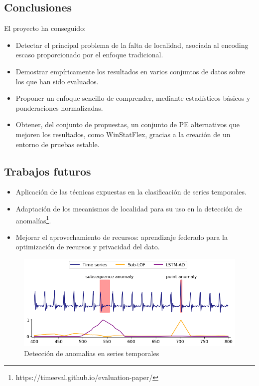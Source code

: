 \documentclass[compress]{beamer}
\begin{document}
\subsection{Conclusiones}
\begin{frame}{}
		El proyecto ha conseguido:
		\begin{itemize}
			\item Detectar el principal problema de la falta de localidad, asociada al encoding escaso proporcionado por el enfoque tradicional.
			\item Demostrar empíricamente los resultados en varios conjuntos de datos sobre los que han sido evaluados.
			\item Proponer un enfoque sencillo de comprender,  mediante estadísticos básicos y ponderaciones normalizadas.
			\item Obtener, del conjunto de propuestas, un conjunto de PE alternativos que mejoren los resultados, como WinStatFlex, gracias a la creación de un entorno de pruebas estable.
		\end{itemize}
	
\end{frame}


\subsection{Trabajos futuros}
\begin{frame}{}

\begin{itemize}
	\item Aplicación de las técnicas expuestas en la clasificación de series temporales.
	\item Adaptación de los mecanismos de localidad para su uso en la detección de anomalías\footnote{https://timeeval.github.io/evaluation-paper/}.
	\item Mejorar el aprovechamiento de recursos: aprendizaje federado para la optimización de recursos y privacidad del dato.
\end{itemize}


\begin{figure}
	\includegraphics[scale=0.3]{pic/anomaly.png}
	\caption{Detección de anomalías en series temporales}
\end{figure}
	
\end{frame}
\end{document}
